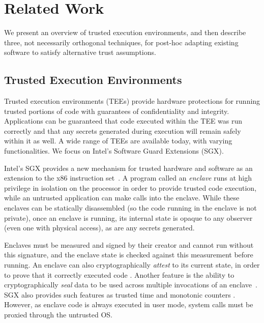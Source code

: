 \section{Related Work}
\label{sec:related}

We present an overview of trusted execution environments, and then describe
three, not necessarily orthogonal techniques, for post-hoc adapting existing
software to satisfy alternative trust assumptions. 


\subsection{Trusted Execution Environments}

Trusted execution environments (TEEs) provide hardware protections for running
trusted portions of code with guarantees of confidentiality and integrity.  
%
Applications can be guaranteed that code executed within the TEE was run
correctly and that any secrets generated during execution will remain safely
within it as well.
%
A wide range of TEEs are available today, with varying functionalities.
%
We focus on Intel's Software Guard Extensions (SGX)\@.


%
Intel's SGX provides a new mechanism for trusted
hardware and software as an extension to the x86 instruction set~\cite{sgx,
mckeen2013innovative}.  
%
A program called an \textit{enclave} runs at high
privilege in isolation on the processor in order to provide trusted code
execution, while an untrusted application can make calls into the enclave.
%
While these enclaves can be statically disassembled (so the code running in the
enclave is not private), once an enclave is running, its internal state is
opaque to any observer (even one with physical access), as are any secrets generated.  


Enclaves must be measured and signed by their creator and cannot run without
this signature, and the enclave state is checked against this measurement
before running.  
%
An enclave can also cryptographically \textit{attest} to its current state, in
order to prove that it correctly executed code \cite{sgx_provisioning,
anati2013innovative}.  
%
Another feature is the ability to cryptographically \textit{seal} data to be
used across multiple invocations of an enclave~\cite{anati2013innovative,
sgx_sealing}.  
%
SGX also provides such features as trusted time and monotonic counters
\cite{sgx-linux-sdk,sgx-trusted-time}.  
%
However, as enclave code is always executed in user mode, system calls
must be proxied through the untrusted OS.


